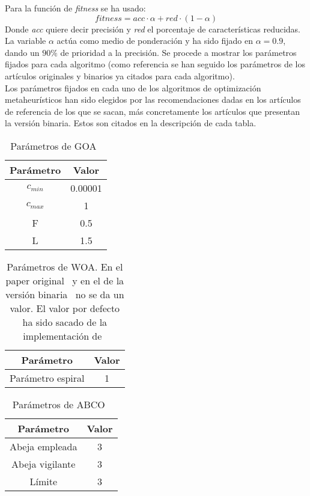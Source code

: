 Para la función de \textit{fitness} se ha usado:
\begin{equation}
    fitness = acc\cdot\alpha + red\cdot(1-\alpha)
\end{equation}
Donde \textit{acc} quiere decir precisión y \textit{red} el porcentaje de características reducidas. La variable $\alpha$ actúa como medio de ponderación y ha sido fijado en $\alpha=0.9$, dando un $90\%$ de prioridad a la precisión.
Se procede a mostrar los parámetros fijados para cada algoritmo (como referencia se han seguido los parámetros de los artículos originales y binarios ya citados para cada algoritmo).\\[6pt]
Los parámetros fijados en cada uno de los algoritmos de optimización metaheurísticos han sido elegidos por las recomendaciones dadas en los artículos de referencia de los que se sacan, más concretamente los artículos que presentan la versión binaria. Estos son citados en la descripción de cada tabla.

\begin{table}[H]
    \centering
    \begin{tabular}{ c c }
        \hline
        \textbf{Parámetro} & \textbf{Valor} \\
        \hline
        $c_{min}$          & 0.00001        \\
        $c_{max}$          & 1              \\
        F                  & 0.5            \\
        L                  & 1.5            \\
        \hline
    \end{tabular}
    \caption{Parámetros de GOA~\cite{mafarja_binary_2019}}
\end{table}

\begin{table}[H]
    \centering
    \begin{tabular}{ c c }
        \hline
        \textbf{Parámetro} & \textbf{Valor} \\
        \hline
        Parámetro espiral  & 1              \\
        \hline
    \end{tabular}
    \caption{Parámetros de WOA. En el paper original~\cite{mirjalili_whale_2016} y en el de la versión binaria~\cite{mafarja_whale_2018} no se da un valor. El valor por defecto ha sido sacado de la implementación de~\cite{Li2019AnAW}}
\end{table}

\begin{table}[H]
    \centering
    \begin{tabular}{ c c }
        \hline
        \textbf{Parámetro} & \textbf{Valor} \\
        \hline
        Abeja empleada     & 3              \\
        Abeja vigilante    & 3              \\
        Límite             & 3              \\
        \hline
    \end{tabular}
    \caption{Parámetros de ABCO~\cite{karaboga_idea_nodate}}
\end{table}

